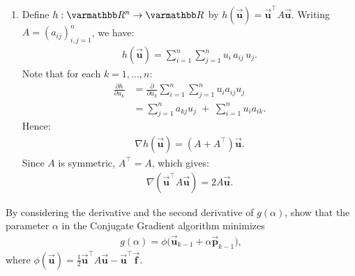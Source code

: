 \documentclass[10pt,oneside,openany]{memoir}
\begin{document}
\begin{solution}
\begin{enumerate}[label=(\alph*),itemsep=4pt,topsep=4pt]
    \item Define $h:\bfR^n\to\bfR$ by $h(\vec{\boldsymbol{u}})=\vec{\boldsymbol{u}}^{\top}A\vec{\boldsymbol{u}}$. Writing $A=(a_{ij})_{i,j=1}^n$, we have:
        \begin{equation*}
        \begin{split}
            h(\vec{\boldsymbol{u}})
            =\sum_{i=1}^n\sum_{j=1}^n u_i\,a_{ij}\,u_j.
        \end{split}
        \end{equation*}
    Note that for each $k=1,...,n$:
        \begin{equation*}
        \begin{split}
            \frac{\partial h}{\partial u_k}
            &= \frac{\partial}{\partial u_k}\sum_{i=1}^n\sum_{j=1}^n u_i a_{ij} u_j \\
            &= \sum_{j=1}^n a_{kj}u_j \;+\; \sum_{i=1}^n u_i a_{ik}.
        \end{split}
        \end{equation*}
    Hence:
        \begin{equation*}
        \begin{split}
            \nabla h(\vec{\boldsymbol{u}})
            = (A+A^{\top})\vec{\boldsymbol{u}}.
        \end{split}
        \end{equation*}
    Since $A$ is symmetric, $A^{\top}=A$, which gives:
        \begin{equation*}
        \begin{split}
            \nabla(\vec{\boldsymbol{u}}^{\top}A\vec{\boldsymbol{u}})
            = 2A\vec{\boldsymbol{u}}.
        \end{split}
        \end{equation*}
\end{enumerate}
\end{solution}
\begin{exercise}[manual-num={4.1}]
    By considering the derivative and the second derivative of $g(\alpha)$, show that the parameter $\alpha$ in the Conjugate Gradient algorithm minimizes 
        \begin{equation*}
        \begin{split}
            g(\alpha) = \phi \bigl( \vec{\boldsymbol{u}}_{k-1} + \alpha \vec{\boldsymbol{p}}_{k-1}\bigr),
        \end{split}
        \end{equation*}
    where $\phi(\vec{\boldsymbol{u}}) = \frac{1}{2}\vec{\boldsymbol{u}}^\top A \vec{\boldsymbol{u}} - \vec{\boldsymbol{u}}^\top \vec{\boldsymbol{f}}$.
\end{exercise}
\end{document}
